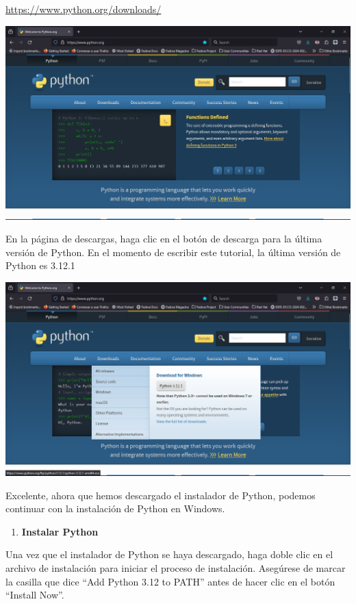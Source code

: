 \documentclass[
  a4paper,
  DIV=11,
  numbers=noendperiod,
  onepage,
  openany]{scrreprt}
\providecommand{\tightlist}{%
  \setlength{\itemsep}{0pt}\setlength{\parskip}{0pt}}\usepackage{longtable,booktabs,array}
\begin{document}
\url{https://www.python.org/downloads/}

\includegraphics{unidades/unidad2/images/paste-1.png}

En la página de descargas, haga clic en el botón de descarga para la
última versión de Python. En el momento de escribir este tutorial, la
última versión de Python es 3.12.1

\includegraphics{unidades/unidad2/images/paste-2.png}

Excelente, ahora que hemos descargado el instalador de Python, podemos
continuar con la instalación de Python en Windows.

\begin{enumerate}
\def\labelenumi{\arabic{enumi}.}
\setcounter{enumi}{1}
\tightlist
\item
  \textbf{Instalar Python}
\end{enumerate}

Una vez que el instalador de Python se haya descargado, haga doble clic
en el archivo de instalación para iniciar el proceso de instalación.
Asegúrese de marcar la casilla que dice ``Add Python 3.12 to PATH''
antes de hacer clic en el botón ``Install Now''.
\end{document}
